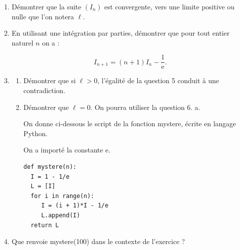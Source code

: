 \documentclass[10pt]{article}
\providecommand{\e}{{\mathrm{e}}}
\begin{document}
\begin{enumerate}
\begin{enumerate}
\[0 \leqslant x^{n+1} \leqslant x^n.\]

		\item En déduire que pour tout entier naturel $n$, on a :

\[0 \leqslant I_{n+1} \leqslant I_n.\]
	\end{enumerate}
\item Démontrer que la suite $(I_n)$ est convergente, vers une limite positive ou nulle que l'on notera $\ell$.
\item En utilisant une intégration par parties, démontrer que pour tout entier naturel $n$ on a :

\[I_{n+1} = (n + 1)I_n - \dfrac{1}{\e}.\]
\item
	\begin{enumerate}
		\item Démontrer que si $\ell > 0$, l'égalité de la question 5 conduit à une contradiction.
		\item Démontrer que $\ell = 0$. On pourra utiliser la question 6. a.

\medskip

On donne ci-dessous le script de la fonction mystere, écrite en langage Python.

On a importé la constante e.

\begin{center}
\begin{Verbatim}[frame=single]
def mystere(n):
  I = 1 - 1/e
  L = [I]
  for i in range(n):
     I = (i + 1)*I - 1/e
     L.append(I) 
  return L
\end{Verbatim}
\end{center}
	\end{enumerate}
\item Que renvoie mystere(100) dans le contexte de l'exercice ?

\end{enumerate}

\bigskip
\end{document}
